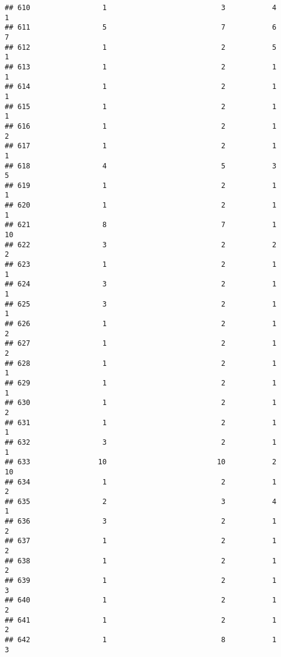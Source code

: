 \documentclass[
]{article}
\begin{document}
\begin{verbatim}
## 610                 1                           3           4               1
## 611                 5                           7           6               7
## 612                 1                           2           5               1
## 613                 1                           2           1               1
## 614                 1                           2           1               1
## 615                 1                           2           1               1
## 616                 1                           2           1               2
## 617                 1                           2           1               1
## 618                 4                           5           3               5
## 619                 1                           2           1               1
## 620                 1                           2           1               1
## 621                 8                           7           1              10
## 622                 3                           2           2               2
## 623                 1                           2           1               1
## 624                 3                           2           1               1
## 625                 3                           2           1               1
## 626                 1                           2           1               2
## 627                 1                           2           1               2
## 628                 1                           2           1               1
## 629                 1                           2           1               1
## 630                 1                           2           1               2
## 631                 1                           2           1               1
## 632                 3                           2           1               1
## 633                10                          10           2              10
## 634                 1                           2           1               2
## 635                 2                           3           4               1
## 636                 3                           2           1               2
## 637                 1                           2           1               2
## 638                 1                           2           1               2
## 639                 1                           2           1               3
## 640                 1                           2           1               2
## 641                 1                           2           1               2
## 642                 1                           8           1               3

\end{verbatim}
\end{document}
